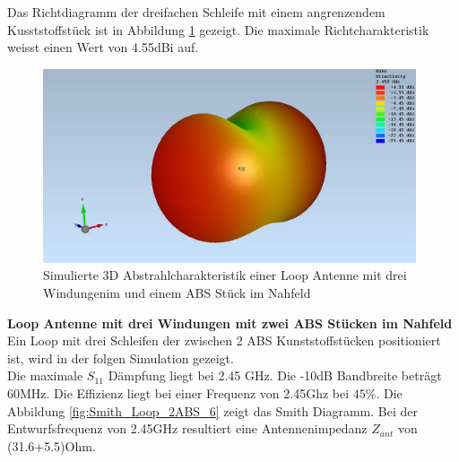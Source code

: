 Das Richtdiagramm der dreifachen Schleife mit einem angrenzendem Kusststoffstück ist in Abbildung \ref{fig:sim_Loop_3Fach_1ABS_3D} gezeigt. Die maximale Richtcharakteristik weisst einen Wert von 4.55dBi auf.
\begin{figure}[h]
	\centering
	\includegraphics[width=11cm]{content/bilder/Evaluation/Loop/Mit1ABS/EM_Far_Filed_Loop_Coil_1ABS.JPG}%
	\caption{Simulierte 3D Abstrahlcharakteristik einer Loop Antenne mit  drei Windungenim und einem ABS Stück im Nahfeld}
	\label{fig:sim_Loop_3Fach_1ABS_3D}
\end{figure}
\newpage
\textbf{Loop Antenne mit drei Windungen mit zwei ABS Stücken im Nahfeld}\\
Ein Loop mit drei Schleifen der zwischen 2 ABS Kunststoffstücken positioniert ist, wird in der folgen Simulation gezeigt.\\
Die maximale $S_{11}$ Dämpfung liegt bei 2.45 GHz. Die -10dB Bandbreite beträgt 60MHz. Die Effizienz liegt bei einer Frequenz von 2.45Ghz bei $45\%$. Die Abbildung \ref{fig:Smith_Loop_2ABS_6} zeigt das Smith Diagramm. Bei der Entwurfsfrequenz von 2.45GHz resultiert eine Antennenimpedanz $Z_{ant}$ von (31.6+5.5)Ohm.
